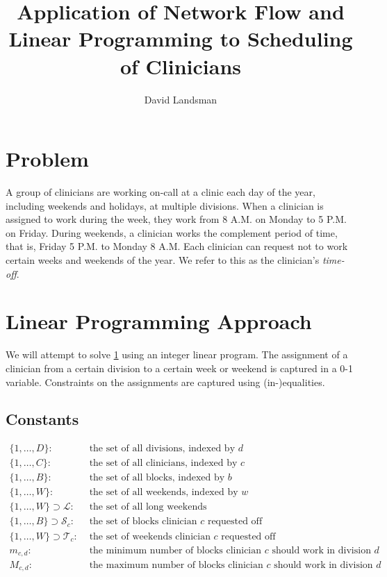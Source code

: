 \documentclass[]{article}
\title{Application of Network Flow and Linear Programming to Scheduling of Clinicians}
\author{David Landsman}
\newcommand{\mc}{\mathcal}
\begin{document}
\maketitle

\section{Problem} \label{problem}
A group of clinicians are working on-call at a clinic each day of the year, including weekends and holidays, at multiple divisions. When a clinician is assigned to work during the week, they work from 8 A.M. on Monday to 5 P.M. on Friday. During weekends, a clinician works the complement period of time, that is, Friday 5 P.M. to Monday 8 A.M. Each clinician can request not to work certain weeks and weekends of the year. We refer to this as the clinician's \textit{time-off}.

\section{Linear Programming Approach}
We will attempt to solve \ref{problem} using an integer linear program. The assignment of a clinician from a certain division to a certain week or weekend is captured in a 0-1 variable. Constraints on the assignments are captured using (in-)equalities.

\subsection{Constants}
	\begin{align*}
		\{1, \ldots, D\} : &\text{ the set of all divisions, indexed by } d \\
		\{1, \ldots, C\} : &\text{ the set of all clinicians, indexed by } c \\
		\{1, \ldots, B\} : &\text{ the set of all blocks, indexed by } b \\
		\{1, \ldots, W\} : &\text{ the set of all weekends, indexed by } w \\
		\{1, \ldots, W\} \supset \mc{L} : &\text{ the set of all long weekends} \\
		\{1, \ldots, B\} \supset\mc{S}_c : &\text{ the set of blocks clinician $c$ requested off} \\
		\{1, \ldots, W\} \supset\mc{T}_c : &\text{ the set of weekends clinician $c$ requested off} \\
		m_{c, d} : &\text{ the minimum number of blocks clinician $c$ should work in division $d$} \\
		M_{c, d} : &\text{ the maximum number of blocks clinician $c$ should work in division $d$}
	\end{align*}
\end{document}
